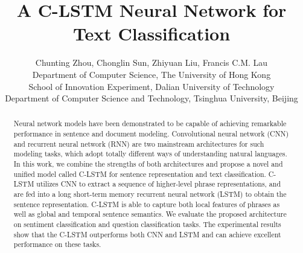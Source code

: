 \documentclass[11pt,letterpaper]{article}
\title{A C-LSTM Neural Network for Text Classification}
\date{}
\author{{Chunting Zhou}, Chonglin Sun, Zhiyuan Liu, Francis C.M. Lau\\
Department of Computer Science, The University of Hong Kong\\
School of Innovation Experiment, Dalian University of Technology\\
Department of Computer Science and Technology, Tsinghua University, Beijing\\
}
\begin{document}
\maketitle

\begin{abstract}
Neural network models have been demonstrated to be capable of achieving
remarkable performance in sentence and document modeling.
Convolutional neural network (CNN) and recurrent neural network
(RNN) are two mainstream architectures for such modeling tasks, which
adopt totally different ways of understanding natural languages.
In this work, we combine the strengths of both architectures
and propose a novel and unified model called C-LSTM for sentence
representation and text classification.
C-LSTM utilizes CNN to extract a sequence of higher-level phrase
representations, and are fed into a long short-term
memory recurrent neural network (LSTM) to obtain the sentence
representation.
C-LSTM is able to capture both local features of phrases as
well as global and temporal sentence semantics.
We evaluate the proposed architecture on sentiment classification and
question classification tasks.
The experimental results show that the C-LSTM outperforms both CNN and LSTM and can achieve excellent performance on these tasks.

\end{abstract}
\end{document}
